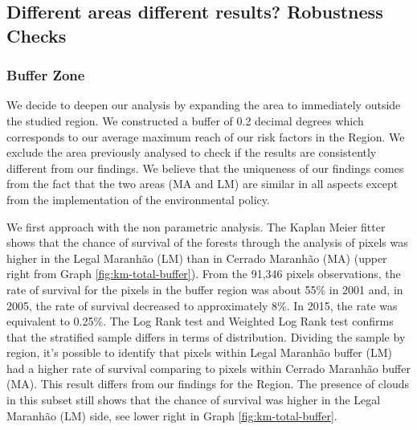 \subsection{Different areas different results? Robustness Checks} \label{resultssection2.1}

\subsubsection{Buffer Zone}
We decide to deepen our analysis by expanding the area to immediately outside the studied region. We constructed a buffer of 0.2 decimal degrees which corresponds to our average maximum reach of our risk factors in the Region. We exclude the area previously analysed to check if the results are consistently different from our findings. We believe that the uniqueness of our findings comes from the fact that the two areas (MA and LM) are similar in all aspects except from the implementation of the environmental policy. 

We first approach with the non parametric analysis. The Kaplan Meier fitter shows that the chance of survival of the forests through the analysis of pixels was higher in the Legal Maranhão (LM) than in Cerrado Maranhão (MA) (upper right from Graph \ref{fig:km-total-buffer}). From the 91,346 pixels observations, the rate of survival for the pixels in the buffer region was about 55\% in 2001 and, in 2005, the rate of survival decreased to approximately 8\%. In 2015, the rate was equivalent to 0.25\%. The Log Rank test and Weighted Log Rank test confirms that the stratified sample differs in terms of distribution. Dividing the sample by region, it's possible to identify that pixels within Legal Maranhão buffer (LM) had a higher rate of survival comparing to pixels within Cerrado Maranhão buffer (MA). This result differs from our findings for the Region. The presence of clouds in this subset still shows that the chance of survival was higher in the Legal Maranhão (LM) side, see lower right in Graph \ref{fig:km-total-buffer}. 

